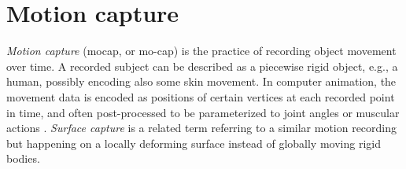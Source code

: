 


%
%
%
%
%

\clearpage
\section{Motion capture} \label{sec:motioncapture} %

\emph{Motion capture} (mocap, or mo-cap) is the practice of recording object movement over time.
A recorded subject can be described as a piecewise rigid object, e.g., a human, possibly encoding also some skin movement.
In computer animation, the movement data is encoded as positions of certain vertices at each recorded point in time, and often post-processed to be parameterized to joint angles or muscular actions \cite{deng2007computer,waters1987muscle}.
\emph{Surface capture} is a related term referring to a similar motion recording but happening on a locally deforming surface instead of globally moving rigid bodies.


